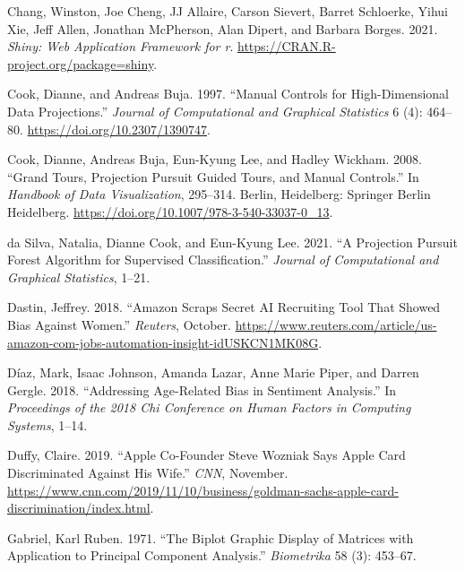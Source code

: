 \documentclass[
]{article}
\newlength{\cslhangindent}
\newlength{\cslentryspacingunit} %
\newenvironment{CSLReferences}[2] %
 {%
  \setlength{\parindent}{0pt}
  \ifodd #1
  \let\oldpar\par
  \def\par{\hangindent=\cslhangindent\oldpar}
  \fi
  \setlength{\parskip}{#2\cslentryspacingunit}
 }%
 {}
\begin{document}
\begin{CSLReferences}{1}{0}
\leavevmode{}%
Chang, Winston, Joe Cheng, JJ Allaire, Carson Sievert, Barret Schloerke, Yihui Xie, Jeff Allen, Jonathan McPherson, Alan Dipert, and Barbara Borges. 2021. \emph{Shiny: Web Application Framework for r}. \url{https://CRAN.R-project.org/package=shiny}.

\leavevmode{}%
Cook, Dianne, and Andreas Buja. 1997. {``Manual {Controls} for {High}-{Dimensional} {Data} {Projections}.''} \emph{Journal of Computational and Graphical Statistics} 6 (4): 464--80. \url{https://doi.org/10.2307/1390747}.

\leavevmode{}%
Cook, Dianne, Andreas Buja, Eun-Kyung Lee, and Hadley Wickham. 2008. {``Grand {Tours}, {Projection} {Pursuit} {Guided} {Tours}, and {Manual} {Controls}.''} In \emph{Handbook of {Data} {Visualization}}, 295--314. Berlin, Heidelberg: Springer Berlin Heidelberg. \url{https://doi.org/10.1007/978-3-540-33037-0_13}.

\leavevmode{}%
da Silva, Natalia, Dianne Cook, and Eun-Kyung Lee. 2021. {``A {Projection} {Pursuit} {Forest} {Algorithm} for {Supervised} {Classification}.''} \emph{Journal of Computational and Graphical Statistics}, 1--21.

\leavevmode{}%
Dastin, Jeffrey. 2018. {``Amazon Scraps Secret {AI} Recruiting Tool That Showed Bias Against Women.''} \emph{Reuters}, October. \url{https://www.reuters.com/article/us-amazon-com-jobs-automation-insight-idUSKCN1MK08G}.

\leavevmode{}%
Díaz, Mark, Isaac Johnson, Amanda Lazar, Anne Marie Piper, and Darren Gergle. 2018. {``Addressing Age-Related Bias in Sentiment Analysis.''} In \emph{Proceedings of the 2018 Chi Conference on Human Factors in Computing Systems}, 1--14.

\leavevmode{}%
Duffy, Claire. 2019. {``Apple Co-Founder {Steve} {Wozniak} Says {Apple} {Card} Discriminated Against His Wife.''} \emph{CNN}, November. \url{https://www.cnn.com/2019/11/10/business/goldman-sachs-apple-card-discrimination/index.html}.

\leavevmode{}%
Gabriel, Karl Ruben. 1971. {``The Biplot Graphic Display of Matrices with Application to Principal Component Analysis.''} \emph{Biometrika} 58 (3): 453--67.


\end{CSLReferences}
\end{document}

